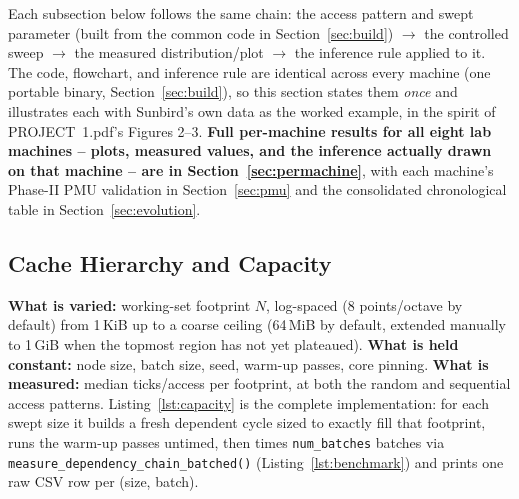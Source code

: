\documentclass{article}
\begin{document}
Each subsection below follows the same chain: the access pattern and swept parameter
(built from the common code in Section~\ref{sec:build}) $\rightarrow$ the controlled sweep
$\rightarrow$ the measured distribution/plot $\rightarrow$ the inference rule applied to it.
The code, flowchart, and inference rule are identical across every machine (one portable
binary, Section~\ref{sec:build}), so this section states them \emph{once} and illustrates
each with Sunbird's own data as the worked example, in the spirit of PROJECT~1.pdf's
Figures 2--3. \textbf{Full per-machine results for all eight lab machines -- plots, measured
values, and the inference actually drawn on that machine -- are in
Section~\ref{sec:permachine}}, with each machine's Phase-II PMU validation in
Section~\ref{sec:pmu} and the consolidated chronological table in
Section~\ref{sec:evolution}.

\subsection{Cache Hierarchy and Capacity}
\label{sec:capacity}

\textbf{What is varied:} working-set footprint $N$, log-spaced (8 points/octave by
default) from 1\,KiB up to a coarse ceiling (64\,MiB by default, extended manually to
1\,GiB when the topmost region has not yet plateaued). \textbf{What is held constant:}
node size, batch size, seed, warm-up passes, core pinning. \textbf{What is measured:}
median ticks/access per footprint, at both the random and sequential access patterns.
Listing~\ref{lst:capacity} is the complete implementation: for each swept size it builds a
fresh dependent cycle sized to exactly fill that footprint, runs the warm-up
passes untimed, then times \texttt{num\_batches} batches via
\texttt{measure\_dependency\_chain\_batched()} (Listing~\ref{lst:benchmark}) and prints one
raw CSV row per (size, batch).
\end{document}
